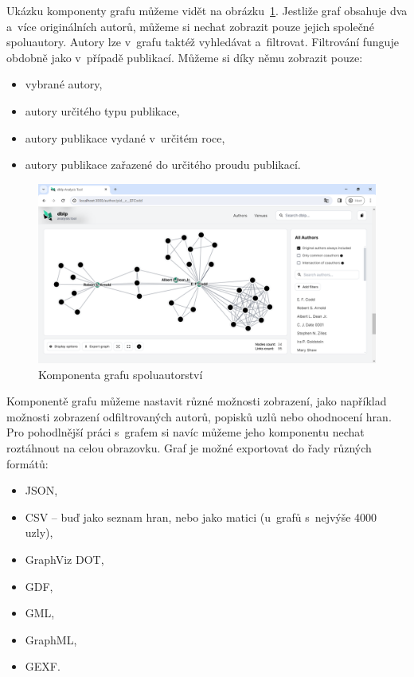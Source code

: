 \documentclass[
  biblatex,
  sourcecodes,
  glossaries,
  index
]{kidiplom}
\begin{document}
Ukázku komponenty grafu můžeme vidět na obrázku~\ref{fig:graf_spoluautorstvi}. Jestliže graf obsahuje dva a~více originálních autorů, můžeme si nechat zobrazit pouze jejich společné spoluautory. Autory lze v~grafu taktéž vyhledávat a~filtrovat. Filtrování funguje obdobně jako v~případě publikací. Můžeme si díky němu zobrazit pouze:
\begin{itemize}
\item vybrané autory,
\item autory určitého typu publikace,
\item autory publikace vydané v~určitém roce,
\item autory publikace zařazené do určitého proudu publikací.
\end{itemize}

\begin{figure}[H]
\begin{center}
\includegraphics[width=\textwidth]{graf_spoluautorstvi}
\caption{Komponenta grafu spoluautorství}\label{fig:graf_spoluautorstvi}
\end{center}
\end{figure}

Komponentě grafu můžeme nastavit různé možnosti zobrazení, jako například možnosti zobrazení odfiltrovaných autorů, popisků uzlů nebo ohodnocení hran. Pro pohodlnější práci s~grafem si navíc můžeme jeho komponentu nechat roztáhnout na celou obrazovku. Graf je možné exportovat do řady různých formátů:
\begin{itemize}
\item JSON,
\item CSV -- buď jako seznam hran, nebo jako matici (u~grafů s~nejvýše 4000 uzly),
\item GraphViz DOT,
\item GDF,
\item GML,
\item GraphML,
\item GEXF.
\end{itemize}
\end{document}
